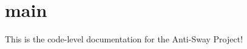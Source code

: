 \chapter{main}
\hypertarget{md_main}{}\label{md_main}
This is the code-\/level documentation for the Anti-\/\+Sway Project! 